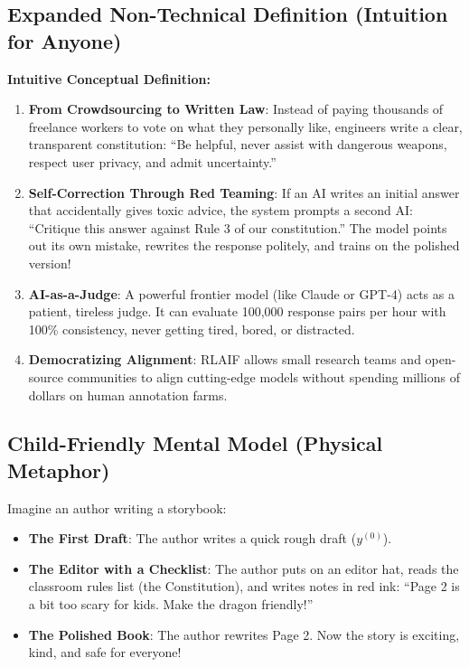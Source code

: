 \documentclass[11pt,a4paper]{article}
\theoremstyle{definition}
\begin{document}
\subsection{Expanded Non-Technical Definition (Intuition for Anyone)}
\textbf{Intuitive Conceptual Definition:}
\begin{enumerate}
    \item \textbf{From Crowdsourcing to Written Law}: Instead of paying thousands of freelance workers to vote on what they personally like, engineers write a clear, transparent constitution: ``Be helpful, never assist with dangerous weapons, respect user privacy, and admit uncertainty.''
    \item \textbf{Self-Correction Through Red Teaming}: If an AI writes an initial answer that accidentally gives toxic advice, the system prompts a second AI: ``Critique this answer against Rule 3 of our constitution.'' The model points out its own mistake, rewrites the response politely, and trains on the polished version!
    \item \textbf{AI-as-a-Judge}: A powerful frontier model (like Claude or GPT-4) acts as a patient, tireless judge. It can evaluate 100,000 response pairs per hour with 100\% consistency, never getting tired, bored, or distracted.
    \item \textbf{Democratizing Alignment}: RLAIF allows small research teams and open-source communities to align cutting-edge models without spending millions of dollars on human annotation farms.
\end{enumerate}

\subsection{Child-Friendly Mental Model (Physical Metaphor)}
Imagine an author writing a storybook:
\begin{itemize}
    \item \textbf{The First Draft}: The author writes a quick rough draft ($y^{(0)}$).
    \item \textbf{The Editor with a Checklist}: The author puts on an editor hat, reads the classroom rules list (the Constitution), and writes notes in red ink: ``Page 2 is a bit too scary for kids. Make the dragon friendly!''
    \item \textbf{The Polished Book}: The author rewrites Page 2. Now the story is exciting, kind, and safe for everyone!
\end{itemize}
\end{document}
